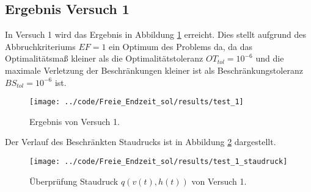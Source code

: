 \subsection{Ergebnis Versuch 1}\label{kap:Versuch1_OptTf}
In Versuch 1 wird das Ergebnis in Abbildung \ref{img:test_1_OptTf} erreicht. Dies stellt aufgrund des Abbruchkriteriums $EF = 1$ ein Optimum des Problems da, da das Optimalitätsmaß kleiner als die Optimalitätstoleranz $OT_{tol} = 10^{-6}$ und die maximale Verletzung der Beschränkungen kleiner ist als Beschränkungstoleranz $BS_{tol} = 10^{-6}$ ist.
\begin{figure}[H]
\begin{center}
\texttt{[image: ../code/Freie\_Endzeit\_sol/results/test\_1]}
\caption{Ergebnis von Versuch 1.}\label{img:test_1_OptTf}
\end{center}
\end{figure}
Der Verlauf des Beschränkten Staudrucks ist in Abbildung \ref{img:test_1_staudruck_OptTf} dargestellt.
\begin{figure}[H]
\begin{center}
\texttt{[image: ../code/Freie\_Endzeit\_sol/results/test\_1\_staudruck]}
\caption{Überprüfung Staudruck $q(v(t),h(t))$ von Versuch 1.}\label{img:test_1_staudruck_OptTf}
\end{center}
\end{figure}